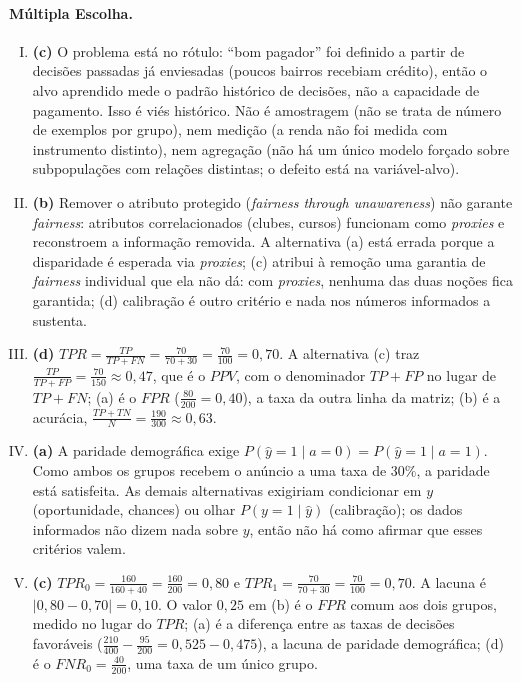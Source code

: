 \documentclass{dlproblemset}
\begin{document}
\paragraph{Múltipla Escolha.}
\begin{enumerate}[I)]
    \item \textbf{(c)} O problema está no rótulo: ``bom pagador'' foi definido a partir de decisões passadas já enviesadas (poucos bairros recebiam crédito), então o alvo aprendido mede o padrão histórico de decisões, não a capacidade de pagamento. Isso é viés histórico. Não é amostragem (não se trata de número de exemplos por grupo), nem medição (a renda não foi medida com instrumento distinto), nem agregação (não há um único modelo forçado sobre subpopulações com relações distintas; o defeito está na variável-alvo).

    \item \textbf{(b)} Remover o atributo protegido (\textit{fairness through unawareness}) não garante \textit{fairness}: atributos correlacionados (clubes, cursos) funcionam como \textit{proxies} e reconstroem a informação removida. A alternativa (a) está errada porque a disparidade é esperada via \textit{proxies}; (c) atribui à remoção uma garantia de \textit{fairness} individual que ela não dá: com \textit{proxies}, nenhuma das duas noções fica garantida; (d) calibração é outro critério e nada nos números informados a sustenta.

    \item \textbf{(d)} $TPR = \frac{TP}{TP+FN} = \frac{70}{70+30} = \frac{70}{100} = 0{,}70$. A alternativa (c) traz $\frac{TP}{TP+FP}=\frac{70}{150}\approx 0{,}47$, que é o $PPV$, com o denominador $TP+FP$ no lugar de $TP+FN$; (a) é o $FPR$ ($\frac{80}{200} = 0{,}40$), a taxa da outra linha da matriz; (b) é a acurácia, $\frac{TP+TN}{N} = \frac{190}{300} \approx 0{,}63$.

    \item \textbf{(a)} A paridade demográfica exige $P(\hat{y}{=}1 \mid a{=}0) = P(\hat{y}{=}1 \mid a{=}1)$. Como ambos os grupos recebem o anúncio a uma taxa de $30\%$, a paridade está satisfeita. As demais alternativas exigiriam condicionar em $y$ (oportunidade, chances) ou olhar $P(y{=}1\mid \hat{y})$ (calibração); os dados informados não dizem nada sobre $y$, então não há como afirmar que esses critérios valem.

    \item \textbf{(c)} $TPR_0 = \frac{160}{160+40} = \frac{160}{200} = 0{,}80$ e $TPR_1 = \frac{70}{70+30} = \frac{70}{100} = 0{,}70$. A lacuna é $|0{,}80 - 0{,}70| = 0{,}10$. O valor $0{,}25$ em (b) é o $FPR$ comum aos dois grupos, medido no lugar do $TPR$; (a) é a diferença entre as taxas de decisões favoráveis ($\frac{210}{400} - \frac{95}{200} = 0{,}525 - 0{,}475$), a lacuna de paridade demográfica; (d) é o $FNR_0 = \frac{40}{200}$, uma taxa de um único grupo.


\end{enumerate}
\end{document}
